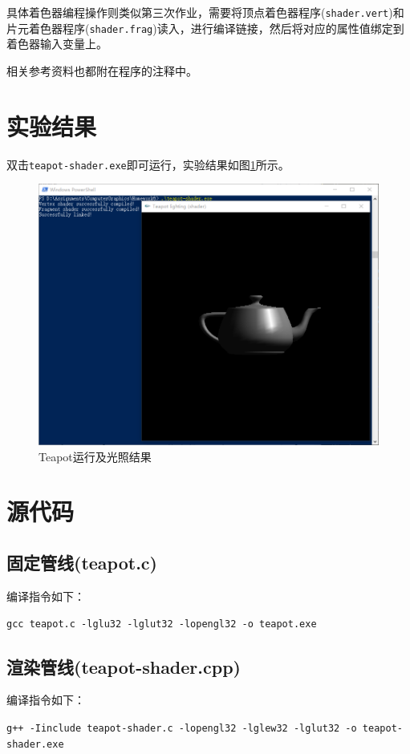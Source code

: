 \documentclass[logo,reportComp]{thesis}
\begin{document}
具体着色器编程操作则类似第三次作业，需要将顶点着色器程序(\verb'shader.vert')和片元着色器程序(\verb'shader.frag')读入，进行编译链接，然后将对应的属性值绑定到着色器输入变量上。

相关参考资料也都附在程序的注释中。

\section{实验结果}
双击\verb'teapot-shader.exe'即可运行，实验结果如图\ref{fig:teapot}所示。
\begin{figure}[H]
\centering
\includegraphics[width=0.9\linewidth]{fig/result-shader.png}
\caption{Teapot运行及光照结果}
\label{fig:teapot}
\end{figure}

\appendixconfig
\appendix
\section{源代码}
\subsection{固定管线(teapot.c)}


编译指令如下：
\begin{flushleft}
\verb'gcc teapot.c -lglu32 -lglut32 -lopengl32 -o teapot.exe'
\end{flushleft}

\subsection{渲染管线(teapot-shader.cpp)}




编译指令如下：
\begin{flushleft}
\verb'g++ -Iinclude teapot-shader.c -lopengl32 -lglew32 -lglut32 -o teapot-shader.exe'
\end{flushleft}
\end{document}
